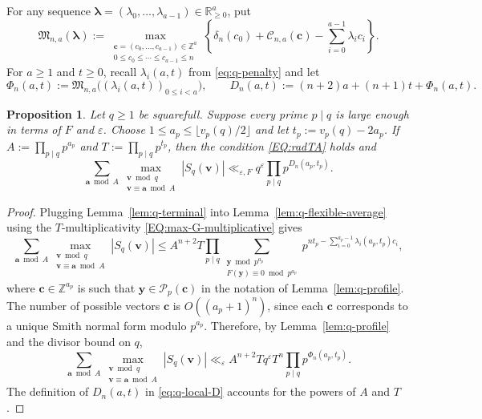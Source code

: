 \documentclass[a4paper,11pt, twoside,reqno]{amsart}
\theoremstyle{plain}
\newtheorem{prop}[thm]{Proposition}
\theoremstyle{definition}
\theoremstyle{remark}
\newcommand{\F}{\mathbb{F}}
\newcommand{\bfa}{\bm{a}}
\newcommand{\bfv}{\bm{v}}
\newcommand{\bfy}{\bm{y}}
\newcommand{\bfc}{\bm{c}}
\newcommand{\ZZ}{\mathbb{Z}}
\newcommand{\RR}{\mathbb{R}}
\newcommand{\ve}{\varepsilon}
\renewcommand{\leq}{\leqslant}
\renewcommand{\ge}{\geqslant}
\renewcommand{\geq}{\geqslant}
\numberwithin{equation}{section}
\begin{document}
For any sequence
\(\boldsymbol\lambda=(\lambda_0,\ldots,\lambda_{a-1})\in \RR_{\ge 0}^a\), put
\begin{equation}
\label{eq:q-master-functional}
\mathfrak M_{n,a}(\boldsymbol\lambda)
:= \max_{\substack{\bfc=(c_0,\ldots,c_{a-1})\in \ZZ^a \\
0\leq c_0\leq\cdots\leq c_{a-1}\leq n}}
\left\{\delta_n(c_0) + \mathcal C_{n,a}(\bfc)
-\sum_{i=0}^{a-1}\lambda_i c_i\right\}.
\end{equation}
For \(a\geq1\) and \(t\geq0\),
recall $\lambda_i(a,t)$ from \eqref{eq:q-penalty} and let
\begin{equation}
\label{eq:q-local-D}
\Phi_n(a,t)
:= \mathfrak M_{n,a}\bigl((\lambda_i(a,t))_{0\leq i<a}\bigr),
\qquad
D_n(a,t) := (n+2)a+(n+1)t+\Phi_n(a,t).
\end{equation}

\begin{prop}
\label{prop:q-smith-bound}
Let $q\ge 1$ be squarefull.
Suppose every prime $p\mid q$
is large enough in terms of $F$ and $\ve$.
Choose \(1\leq a_p\leq\lfloor v_p(q)/2\rfloor\)
and let $t_p := v_p(q)-2a_p$.
If \(A := \prod_{p\mid q} p^{a_p}\)
and $T := \prod_{p\mid q} p^{t_p}$,
then the condition \eqref{EQ:radTA} holds and
\begin{equation}
\sum_{\bfa\bmod{A}}
\max_{\substack{\bfv\bmod{q} \\ \bfv\equiv \bfa\bmod{A}}} |S_q(\bfv)|
\ll_{\ve,F}
q^\ve \prod_{p\mid q}p^{D_n(a_p,t_p)}.
\label{eq:q-global-smith-bound}
\end{equation}
\end{prop}

\begin{proof}
Plugging Lemma~\ref{lem:q-terminal}
into Lemma~\ref{lem:q-flexible-average}
using the $T$-multiplicativity \eqref{EQ:max-G-multiplicative}
gives
\[
\sum_{\bfa\bmod{A}}
\max_{\substack{\bfv\bmod{q} \\ \bfv\equiv \bfa\bmod{A}}} |S_q(\bfv)|
\leq
A^{n+2}T
\prod_{p\mid q} \sum_{\substack{\bfy\bmod p^{a_p}\\F(\bfy)\equiv0\bmod p^{a_p}}}
p^{nt_p-\sum_{i=0}^{a_p-1}\lambda_i(a_p,t_p)c_i},
\]
where $\bfc \in \ZZ^{a_p}$ is such that $\bfy\in \mathcal P_p(\bfc)$
in the notation of Lemma~\ref{lem:q-profile}.
The number of possible vectors $\bfc$ is $O((a_p+1)^n)$,
since each $\bfc$ corresponds to a unique Smith normal form modulo $p^{a_p}$.
Therefore, by Lemma~\ref{lem:q-profile} and the divisor bound on $q$,
\[
\sum_{\bfa\bmod{A}}
\max_{\substack{\bfv\bmod{q} \\ \bfv\equiv \bfa\bmod{A}}} |S_q(\bfv)|
\ll_\ve A^{n+2}T q^\ve T^n
\prod_{p\mid q} p^{\Phi_n(a_p,t_p)}.
\]
The definition of $D_n(a,t)$ in \eqref{eq:q-local-D} accounts for
the powers of $A$ and $T$.
\end{proof}
\end{document}
